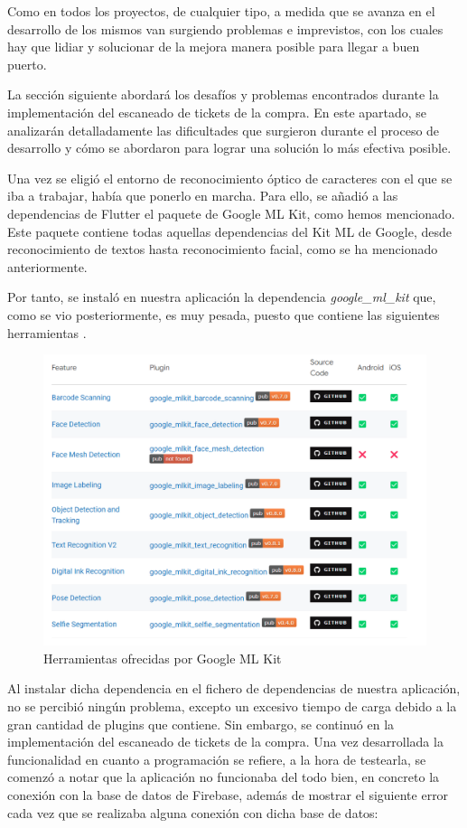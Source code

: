 \documentclass{article}
\begin{document}
Como en todos los proyectos, de cualquier tipo, a medida que se avanza en el desarrollo de los mismos van surgiendo problemas e imprevistos, con los cuales hay que lidiar y solucionar de la mejora manera posible para llegar a buen puerto.

La sección siguiente abordará los desafíos y problemas encontrados durante la implementación del escaneado de tickets de la compra. En este apartado, se analizarán detalladamente las dificultades que surgieron durante el proceso de desarrollo y cómo se abordaron para lograr una solución lo más efectiva posible.

Una vez se eligió el entorno de reconocimiento óptico de caracteres con el que se iba a trabajar, había que ponerlo en marcha. Para ello, se añadió a las dependencias de Flutter el paquete de Google ML Kit, como hemos mencionado. Este paquete contiene todas aquellas dependencias del Kit ML de Google, desde reconocimiento de textos hasta reconocimiento facial, como se ha mencionado anteriormente.

Por tanto, se instaló en nuestra aplicación la dependencia \textit{google\_ml\_kit} que, como se vio posteriormente, es muy pesada, puesto que contiene las siguientes herramientas \cite{google_ml_kit_plugins}.

\begin{figure}[h]
    \centering
    \includegraphics[width=1\textwidth]{imagenes/google_ml_kit.png}
    \caption{Herramientas ofrecidas por Google ML Kit}
\end{figure}

Al instalar dicha dependencia en el fichero de dependencias de nuestra aplicación, no se percibió ningún problema, excepto un excesivo tiempo de carga debido a la gran cantidad de plugins que contiene. Sin embargo, se continuó en la implementación del escaneado de tickets de la compra. Una vez desarrollada la funcionalidad en cuanto a programación se refiere, a la hora de testearla, se comenzó a notar que la aplicación no funcionaba del todo bien, en concreto la conexión con la base de datos de Firebase, además de mostrar el siguiente error cada vez que se realizaba alguna conexión con dicha base de datos:
\end{document}
